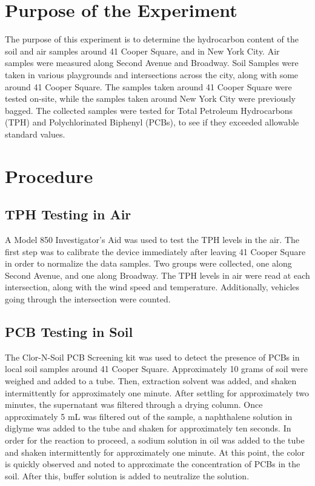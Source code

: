 \documentclass{article}
\begin{document}
    
    \tableofcontents
    \newpage
    \listoftables
    \listoffigures
    \newpage
    \section{Purpose of the Experiment}
    \indent The purpose of this experiment is to determine the hydrocarbon content of the soil and air samples around 41 Cooper Square, and in New York City. Air samples were measured along Second Avenue and Broadway. Soil Samples were taken in various playgrounds and intersections across the city, along with some around 41 Cooper Square. The samples taken around 41 Cooper Square were tested on-site, while the samples taken around New York City were previously bagged. The collected samples were tested for Total Petroleum Hydrocarbons (TPH) and Polychlorinated Biphenyl (PCBs), to see if they exceeded allowable standard values.
    \newpage
    \section{Procedure}
    \subsection{TPH Testing in Air}
    \indent A Model 850 Investigator's Aid was used to test the TPH levels in the air. The first step was to calibrate the device immediately after leaving 41 Cooper Square in order to normalize the data samples. Two groups were collected, one along Second Avenue, and one along Broadway. The TPH levels in air were read at each intersection, along with the wind speed and temperature. Additionally, vehicles going through the intersection were counted.
    \subsection{PCB Testing in Soil}
    \indent The Clor-N-Soil PCB Screening kit was used to detect the presence of PCBs in local soil samples around 41 Cooper Square. Approximately 10 grams of soil were weighed and added to a tube. Then, extraction solvent was added, and shaken intermittently for approximately one minute. After settling for approximately two minutes, the supernatant was filtered through a drying column. Once approximately 5 mL was filtered out of the sample, a naphthalene solution in diglyme was added to the tube and shaken for approximately ten seconds. In order for the reaction to proceed, a sodium solution in oil was added to the tube and shaken intermittently for approximately one minute. At this point, the color is quickly observed and noted to approximate the concentration of PCBs in the soil. After this, buffer solution is added to neutralize the solution. 
\end{document}

